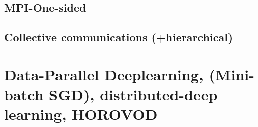         \subsection{MPI-One-sided}
        \subsection{Collective communications (+hierarchical)}
    \section{ Data-Parallel Deeplearning, (Mini-batch SGD), distributed-deep learning, HOROVOD \cite{Ben-Nun2019DemystifyDL, Sergeev2018Horovod}}

\clearpage




